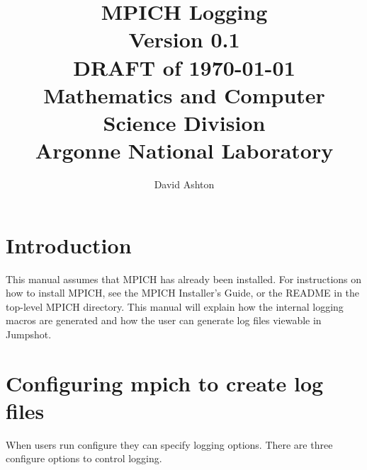 \documentclass[dvipdfm,11pt]{article}
\begin{document}
\title{MPICH Logging\\
Version 0.1\\
DRAFT of \today\\
Mathematics and Computer Science Division\\
Argonne National Laboratory}

\author{David Ashton}


\maketitle

\cleardoublepage

\pagestyle{headings}


\section{Introduction}
\label{sec:introduction}

This manual assumes that MPICH has already been installed.  For
instructions on how to install MPICH, see the MPICH Installer's Guide,
or the README in the top-level MPICH directory.  This manual will
explain how the internal logging macros are generated and how the user
can generate log files viewable in Jumpshot.


\section{Configuring mpich to create log files}
\label{sec:configuring}

When users run configure they can specify logging options.  There are three 
configure options to control logging.
\end{document}
